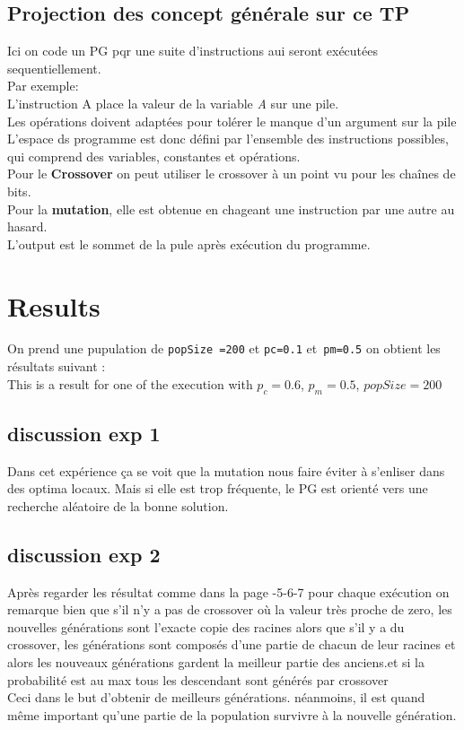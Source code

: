 \subsection{Projection des concept générale sur ce TP}
Ici on code un PG pqr une suite d'instructions aui seront exécutées sequentiellement.\\
Par exemple:\\ \texttt{}
L'instruction A place la valeur de la variable \textit{A} sur une pile.\\
Les opérations doivent adaptées pour tolérer le manque d'un argument sur la pile\\
L'espace ds programme est donc défini par l'ensemble des instructions possibles, qui 
comprend des variables, constantes et opérations.\\
Pour le \textbf{Crossover} on peut utiliser le crossover à un point vu pour les chaînes 
de bits.\\
Pour la \textbf{mutation}, elle est obtenue en chageant une instruction par une autre 
au hasard.\\
L'output est le sommet de la pule après exécution du programme.

\section{Results}
On prend une pupulation de \texttt{popSize =200} et \texttt{pc=0.1} et\texttt{ pm=0.5}
on obtient les résultats suivant :\\
This is a result for one of the execution with 
$ p_c = 0.6 $, $ p_m = 0.5 $, $ popSize = 200 $


\subsection{discussion exp 1}
Dans cet expérience ça se voit que la mutation nous faire éviter à s'enliser dans des 
optima locaux. Mais si elle est trop fréquente, le PG est orienté vers une recherche 
aléatoire de la bonne solution.


\subsection{discussion exp 2}
Après regarder les résultat comme dans la page -5-6-7 pour chaque exécution on 
remarque bien que s'il n'y a pas de crossover où la valeur très proche de zero, 
les nouvelles générations sont l'exacte copie des racines alors que s'il y a du crossover, 
les générations sont composés d'une partie de chacun de leur racines et alors les nouveaux 
générations gardent la meilleur partie des  anciens.et si la probabilité est au max tous les 
descendant sont générés par crossover\\Ceci dans le but d'obtenir de meilleurs générations. 
néanmoins, il est quand même important qu'une partie de la population survivre à la nouvelle 
génération.


